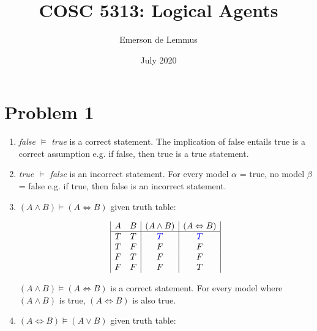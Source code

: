 \documentclass{article}
\title{COSC 5313: Logical Agents}
\author{Emerson de Lemmus }
\date{July 2020}
\begin{document}
\maketitle

\section*{Problem 1}
\begin{enumerate}
    \item \textit{false $\vDash$ true} is a correct statement. The implication of false entails true is a correct assumption e.g. if false, then true is a true statement.\\
    
    \item \textit{true $\vDash$ false} is an incorrect statement. For every model $\alpha$ = true, no model $\beta$ = false e.g. if true, then false is an incorrect statement.\\
    
    \item \textit{$(A \land B) \vDash (A \Leftrightarrow B)$} given truth table: 
    
        \begin{center}
        \begin{displaymath}
            \begin{array}{|c c|c|c|}
                A & B & (A \land B) & (A \Leftrightarrow B)\\
                \hline
                T & T & {\textcolor{blue}{T}} & {\textcolor{blue}{T}}\\
                T & F & F & F\\
                F & T & F & F\\
                F & F & F & T\\
            \end{array}
        \end{displaymath}
        \end{center}
        
    \textit{$(A \land B) \vDash (A \Leftrightarrow B)$} is a correct statement. For every model where $(A \land B)$ is true, $(A \Leftrightarrow B)$ is also true.\\
    
    \item \textit{$(A \Leftrightarrow B) \vDash (A \lor B)$} given truth table: 
    

\end{enumerate}
\end{document}
